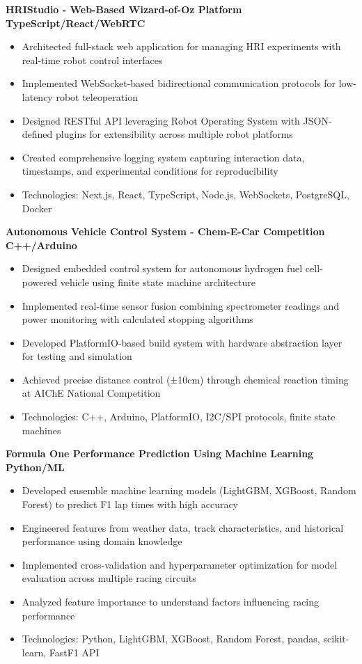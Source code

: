 \documentclass{article}
\begin{document}
\textbf{HRIStudio - Web-Based Wizard-of-Oz Platform} \hfill \textbf{TypeScript/React/WebRTC}
\begin{itemize}[noitemsep,topsep=2pt]
    \item Architected full-stack web application for managing HRI experiments with real-time robot control interfaces
    \item Implemented WebSocket-based bidirectional communication protocols for low-latency robot teleoperation
    \item Designed RESTful API leveraging Robot Operating System with JSON-defined plugins for extensibility across multiple robot platforms
    \item Created comprehensive logging system capturing interaction data, timestamps, and experimental conditions for reproducibility
    \item Technologies: Next.js, React, TypeScript, Node.js, WebSockets, PostgreSQL, Docker
\end{itemize}

\textbf{Autonomous Vehicle Control System - Chem-E-Car Competition} \hfill \textbf{C++/Arduino}
\begin{itemize}[noitemsep,topsep=2pt]
    \item Designed embedded control system for autonomous hydrogen fuel cell-powered vehicle using finite state machine architecture
    \item Implemented real-time sensor fusion combining spectrometer readings and power monitoring with calculated stopping algorithms
    \item Developed PlatformIO-based build system with hardware abstraction layer for testing and simulation
    \item Achieved precise distance control (±10cm) through chemical reaction timing at AIChE National Competition
    \item Technologies: C++, Arduino, PlatformIO, I2C/SPI protocols, finite state machines
\end{itemize}

\textbf{Formula One Performance Prediction Using Machine Learning} \hfill \textbf{Python/ML}
\begin{itemize}[noitemsep,topsep=2pt]
    \item Developed ensemble machine learning models (LightGBM, XGBoost, Random Forest) to predict F1 lap times with high accuracy
    \item Engineered features from weather data, track characteristics, and historical performance using domain knowledge
    \item Implemented cross-validation and hyperparameter optimization for model evaluation across multiple racing circuits
    \item Analyzed feature importance to understand factors influencing racing performance
    \item Technologies: Python, LightGBM, XGBoost, Random Forest, pandas, scikit-learn, FastF1 API
\end{itemize}
\end{document}
